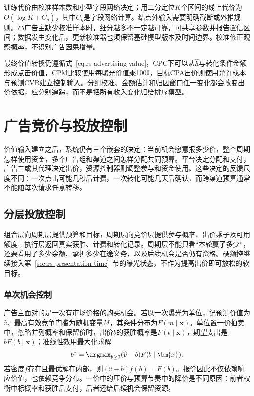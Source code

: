 训练代价由校准样本数和小型字段网络决定；用二分定位$K$个区间的线上代价为$O(\log K+C_g)$，其中$C_g$是字段网络计算。结点外输入需要明确截断或外推规则。小广告主缺少校准样本时，细分越多不一定越可靠，可共享参数并报告置信区间；数据发生变化后，更新校准器也须保留基础模型版本及时间边界。校准修正观察概率，不识别广告因果增量。

最终价值转换仍遵循式~\eqref{eq:rs-advertising-value}。CPC下可以从$\widehat h$与转化条件金额形成点击价值，CPM比较使用每曝光价值乘1000，目标CPA出价则使用允许成本与预测CVR建立控制输入。分组校准、金额估计和归因窗口任一变化都会改变出价依据，应分别追踪，而不是把所有收入变化归给排序模型。

\section{广告竞价与投放控制}
\label{sec:rs-advertising-control}

价值输入建立之后，系统仍有三个嵌套的决定：当前机会愿意报多少价，整个周期怎样使用资金，多个广告组和渠道之间怎样分配共同预算。平台决定分配和支付，广告主或其代理决定出价，资源控制器则调整参与和资金使用。这些决定的反馈尺度不同：一次点击可能几秒后计费，一次转化可能几天后确认，而跨渠道预算通常不能随每次请求任意转移。

\subsection{分层投放控制}
\label{sec:rs-advertising-hierarchical-control}

组合层向周期层提供预算和目标，周期层向竞价层提供参与概率、出价乘子及可用额度；执行层返回真实获胜、计费和转化记录。周期层不能只看“本轮赢了多少”，还要看用了多少余额、承担多少在途义务，以及后续机会是否仍有资格。硬频控继续接入第~\ref{sec:rs-presentation-time}~节的曝光状态，不作为提高出价即可放松的软目标。

\subsubsection{单次机会控制}
\label{sec:rs-advertising-single}

广告主面对的是一次有市场价格的购买机会。若以一次曝光为单位，记预测价值为$\widehat v$、最高有效竞争门槛为随机变量$M$，其条件分布为$F(m\mid\bm{x})$。单位置一价拍卖中，忽略并列概率和保留价时，出价$b$的获胜概率是$F(b\mid\bm{x})$，期望支出是$bF(b\mid\bm{x})$；准线性效用最大化求解
\begin{equation}
  b^*=\argmax_{b\geq0}(\widehat v-b)F(b\mid\bm{x}).
  \label{eq:rs-advertising-first-price-bid}
\end{equation}
若密度$f$存在且最优解在内部，则$(\widehat v-b)f(b)=F(b)$。报价因此不仅依赖响应价值，也依赖竞争分布。一价中的压价与预算节奏中的降价是不同原因：前者权衡中标概率和获胜后支付，后者还给后续机会保留资源。

